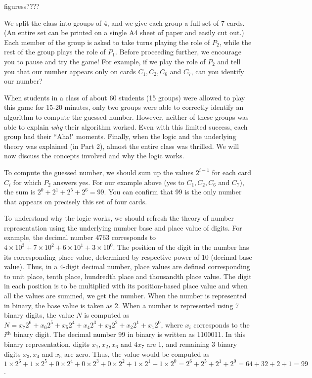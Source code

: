 \begin{multicols}{2}
figuress???? 

We split the class into groups of 4, and we give each group a full set of 7 cards. (An entire set can be printed on a single A4 sheet of paper and easily cut out.) Each member of the group is asked to take turns playing the role of $P_{2}$, while the rest of the group plays the role of $P_{1}$. Before proceeding further, we encourage you to pause and try the game! For example, if we play the role of $P_{2}$ and tell you that our number appears only on cards $C_{1}, C_{2}, C_{6}$ and $C_{7}$, can you identify our number?


When students in a class of about 60 students (15 groups) were allowed to play this game for 15-20 minutes, only two groups were able to correctly identify an algorithm to compute the guessed number. However, neither of these groups was able to explain \textit{why} their algorithm worked. Even with this limited success, each group had their ``Aha!" moments. Finally, when the logic and the underlying theory was explained (in Part 2), almost the entire class was thrilled. We will now discuss the concepts involved and why the logic works.

To compute the guessed number, we should sum up the values $2^{i-1}$ for each card $C_{i}$ for which $P_{2}$ answers yes. For our example above (yes to $C_{1}, C_{2}, C_{6}$ and $C_{7}$), the sum is $2^{0} + 2^{1} + 2^{5} + 2^{6} = 99$. You can confirm that 99 is the only number that appears on precisely this set of four cards. 
 
To understand why the logic works, we should refresh the theory of number representation using the underlying number base and place value of digits. For example, the decimal number 4763 corresponds to $4\times10^{3}+7\times10^{2}+6\times10^{1}+3\times10^{0}$. The position of the digit in the number has its corresponding place value, determined by respective power of 10 (decimal base value). Thus, in a 4-digit decimal number, place values are defined corresponding to unit place, tenth place, hundredth place and thousandth place value. The digit in each position is to be multiplied with its position-based place value and when all the values are summed, we get the number.  When the number is represented in binary, the base value is taken as 2. When a number is represented using 7 binary digits, the value $N$ is computed as $N=x_{7}2^{6}+x_{6}2^{5}+x_{5}2^{4}+x_{4}2^{3} + x_{3}2^{2}+x_{2}2^{1} + x_{1}2^{0}$, where $x_{i}$ corresponds to the $i^{\rm th}$ binary digit. The decimal number 99 in binary is written as 1100011. In this binary representation, digits $x_{1},  x_{2}, x_{6}$ and $4x_{7}$ are 1, and remaining 3 binary digits $x_{3}, x_{4}$ and $x_{5}$ are zero. Thus, the value would be computed as $1\times2^{6} + 1\times 2^{5} + 0\times 2^{4} + 0\times 2^{3}+0\times 2^{2}+1\times 2^{1} +1\times 2^{0} = 2^{6} + 2^{5} + 2^{1} + 2^{0} = 64 + 32 + 2 + 1 = 99$. 


\end{multicols}
